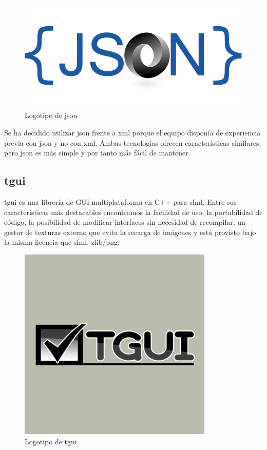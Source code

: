 		\begin{figure}[!htp]
			 \centering
			 \includegraphics{fig/json}
			 \caption{Logotipo de \acrshort{json}}
			 \label{fig:json}
		\end{figure}

		Se ha decidido utilizar \acrshort{json} frente a \acrshort{xml} porque el equipo disponía de experiencia previa con \acrshort{json} y no con \acrshort{xml}. Ambas tecnologías ofrecen características similares, pero \acrshort{json} es más simple y por tanto más fácil de mantener.

	\subsection{\acrshort{tgui}}

		\acrfull{tgui} es una librería de GUI multiplataforma en C++ para \acrshort{sfml}. Entre sus características más destacables encontramos la facilidad de uso, la portabilidad de código, la posibilidad de modificar interfaces sin necesidad de recompilar, un gestor de texturas externo que evita la recarga de imágenes y está provisto bajo la misma licencia que \acrshort{sfml}, zlib/png.

		\begin{figure}[!htp]
			 \centering
			 \includegraphics{fig/tgui}
			 \caption{Logotipo de \acrshort{tgui}}
			 \label{fig:tgui}
		\end{figure}

